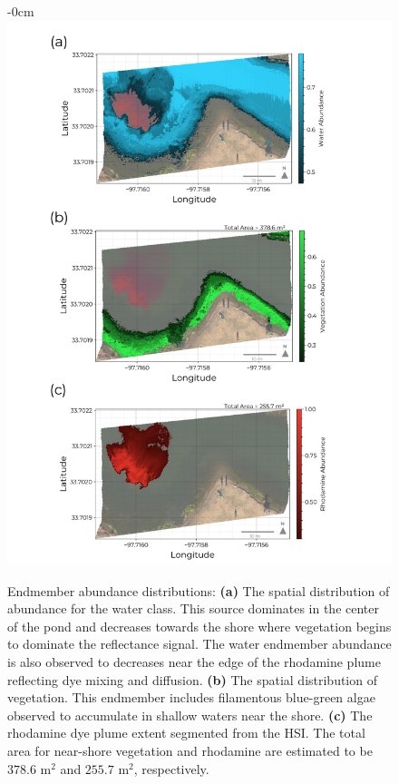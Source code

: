 \documentclass[remotesensing,article,submit,pdftex,moreauthors]{Definitions/mdpi}
\begin{document}
\newpage
\begin{figure}[H]
\begin{adjustwidth}{-\extralength}{0cm}
\centering
\includegraphics[width=\columnwidth]{results/robot-team/endmember-abundances.pdf}
\caption{Endmember abundance distributions: \textbf{(a)} The spatial distribution of abundance for the water class. This source dominates in the center of the pond and decreases towards the shore where vegetation begins to dominate the reflectance signal. The water endmember abundance is also observed to decreases near the edge of the rhodamine plume reflecting dye mixing and diffusion. \textbf{(b)} The spatial distribution of vegetation. This endmember includes filamentous blue-green algae observed to accumulate in shallow waters near the shore. \textbf{(c)} The rhodamine dye plume extent segmented from the HSI. The total area for near-shore vegetation and rhodamine are estimated to be $378.6$ $\text{m}^2$ and $255.7$ $\text{m}^2$, respectively.}
\label{fig:endmember-abundance-dist}
\end{adjustwidth}
\end{figure}  
\newpage
\end{document}
